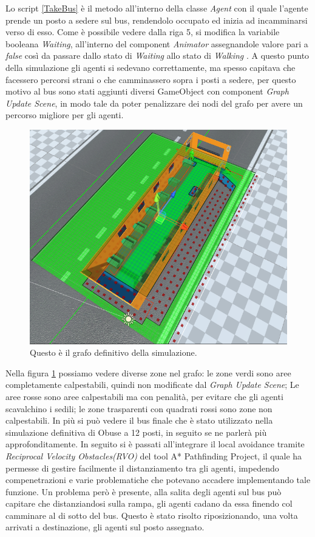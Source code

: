\documentclass[12pt, openany]{book}
\begin{document}
	Lo script \ref{TakeBus} è il metodo all'interno della classe \emph{Agent} con il quale l'agente prende un posto a sedere sul bus, rendendolo occupato ed inizia ad incamminarsi verso di esso. Come è possibile vedere dalla riga 5, si modifica la variabile booleana \emph{Waiting}, all'interno del component \emph{Animator} assegnandole valore pari a \emph{false} così da passare dallo stato di \emph{Waiting} allo stato di \emph{Walking} .  \newpage
	A questo punto della simulazione gli agenti si sedevano correttamente, ma spesso capitava che facessero percorsi strani o che camminassero sopra i posti a sedere, per questo motivo al bus sono stati aggiunti diversi GameObject con component \emph{Graph Update Scene}, in modo tale da poter penalizzare dei nodi del grafo per avere un percorso migliore per gli agenti.
	\begin{figure}[H]
		\centering
		\includegraphics[width=1\linewidth]{"Immagini/AreaGrafo.png"}
		\caption{Questo è il grafo definitivo della simulazione.}
		\label{fig:AreaGrafo}
	\end{figure}
	Nella figura \ref{fig:AreaGrafo} possiamo vedere diverse zone nel grafo: le zone verdi sono aree completamente calpestabili, quindi non modificate dal \emph{Graph Update Scene}; Le aree rosse sono aree calpestabili ma con penalità, per evitare che gli agenti scavalchino i sedili; le zone trasparenti con quadrati rossi sono zone non calpestabili. In più si può vedere il bus finale che è stato utilizzato nella simulazione definitiva di Obuse a 12 posti, in seguito se ne parlerà più approfonditamente.
	In seguito si è passati all'integrare il local avoidance tramite \emph{Reciprocal Velocity Obstacles(RVO)} del tool A* Pathfinding Project, il quale ha permesse di gestire facilmente il distanziamento tra gli agenti, impedendo compenetrazioni e varie problematiche che potevano accadere implementando tale funzione. Un problema però è presente, alla salita degli agenti sul bus può capitare che distanziandosi sulla rampa, gli agenti cadano da essa finendo col camminare al di sotto del bus. Questo è stato risolto riposizionando, una volta arrivati a destinazione, gli agenti sul posto assegnato.
	
\end{document}
